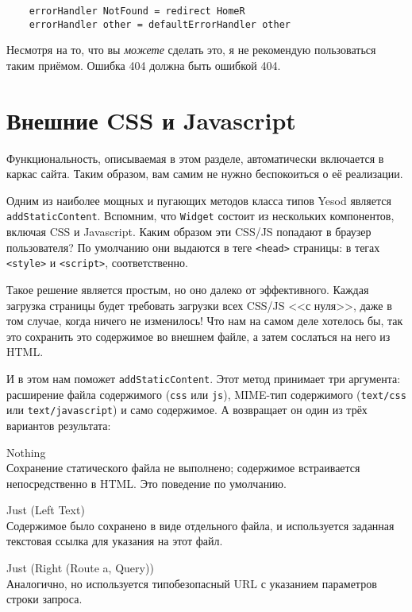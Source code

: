 \begin{lstlisting}
    errorHandler NotFound = redirect HomeR
    errorHandler other = defaultErrorHandler other
\end{lstlisting}

\begin{remark}
    Несмотря на то, что вы \emph{можете} сделать это, я не рекомендую пользоваться
    таким приёмом. Ошибка 404 должна быть ошибкой 404.
\end{remark}

\section {Внешние CSS и Javascript}

\begin{remark}
    Функциональность, описываемая в этом разделе, автоматически включается в
    каркас сайта. Таким образом, вам самим не нужно беспокоиться о её
    реализации.
\end{remark}

Одним из наиболее мощных и пугающих методов класса типов Yesod является
\lstinline!addStaticContent!. Вспомним, что \lstinline!Widget! состоит из
нескольких компонентов, включая CSS и Javascript. Каким образом эти CSS/JS
попадают в браузер пользователя? По умолчанию они выдаются в теге
\lstinline!<head>! страницы: в тегах \lstinline!<style>! и
\lstinline!<script>!, соответственно.

Такое решение является простым, но оно далеко от эффективного. Каждая загрузка
страницы будет требовать загрузки всех CSS/JS <<с нуля>>, даже в том случае,
когда ничего не изменилось! Что нам на самом деле хотелось бы, так это
сохранить это содержимое во внешнем файле, а затем сослаться на него из HTML.

И в этом нам поможет \lstinline!addStaticContent!. Этот метод принимает три
аргумента: расширение файла содержимого (\lstinline!css! или \lstinline!js!),
MIME-тип содержимого (\lstinline!text/css! или \lstinline!text/javascript!) и
само содержимое. А возвращает он один из трёх вариантов результата:

\begin{description}
  \item {Nothing}  \hfill \\
    Сохранение статического файла не выполнено; содержимое встраивается
    непосредственно в HTML. Это поведение по умолчанию.

  \item {Just (Left Text)} \hfill \\
    Содержимое было сохранено в виде отдельного файла, и используется заданная
    текстовая ссылка для указания на этот файл.

  \item {Just (Right (Route a, Query))} \hfill \\
    Аналогично, но используется типобезопасный URL с указанием параметров
    строки запроса.
\end{description}

